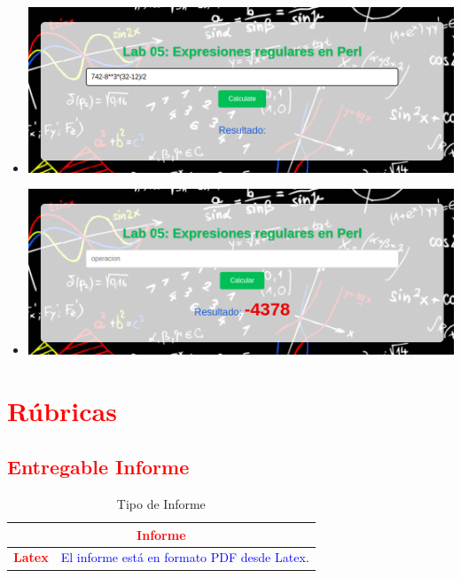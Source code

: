 \documentclass{article}
\begin{document}
\begin{itemize}
                \item [] \includegraphics[width=0.9 \textwidth]{Lab5/latex/img/Pruebas/prueba3.png}
                \item [] \includegraphics[width=0.9 \textwidth]{Lab5/latex/img/Pruebas/rptaPrueba3.png}
                
            \end{itemize}
   		

	\section{\textcolor{red}{Rúbricas}}
	
	\subsection{\textcolor{red}{Entregable Informe}}
	\begin{table}[H]
		\caption{Tipo de Informe}
		\setlength{\tabcolsep}{0.5em} %
		{\renewcommand{\arraystretch}{1.5}%
		\begin{tabular}{|p{3cm}|p{12cm}|}
			\hline
			\multicolumn{2}{|c|}{\textbf{\textcolor{red}{Informe}}}  \\
			\hline 
			\textbf{\textcolor{red}{Latex}} & \textcolor{blue}{El informe está en formato PDF desde Latex.}   \\ 
			\hline 
						
		\end{tabular}
	}
	\end{table}
	
\end{document}
